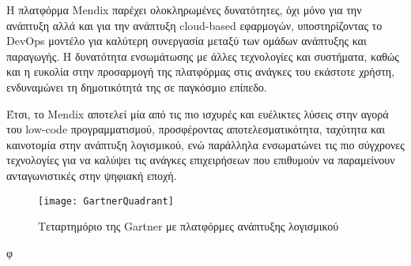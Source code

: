         Η πλατφόρμα Mendix παρέχει ολοκληρωμένες δυνατότητες, όχι μόνο για την ανάπτυξη αλλά και για την ανάπτυξη cloud-based εφαρμογών, υποστηρίζοντας το DevOps μοντέλο για καλύτερη συνεργασία μεταξύ των ομάδων ανάπτυξης και παραγωγής. Η δυνατότητα ενσωμάτωσης με άλλες τεχνολογίες και συστήματα, καθώς και η ευκολία στην προσαρμογή της πλατφόρμας στις ανάγκες του εκάστοτε χρήστη, ενδυναμώνει τη δημοτικότητά της σε παγκόσμιο επίπεδο.

        Έτσι, το Mendix αποτελεί μία από τις πιο ισχυρές και ευέλικτες λύσεις στην αγορά του low-code προγραμματισμού, προσφέροντας αποτελεσματικότητα, ταχύτητα και καινοτομία στην ανάπτυξη λογισμικού, ενώ παράλληλα ενσωματώνει τις πιο σύγχρονες τεχνολογίες για να καλύψει τις ανάγκες επιχειρήσεων που επιθυμούν να παραμείνουν ανταγωνιστικές στην ψηφιακή εποχή.

        \cite{LowCodeMendix}


            \begin{figure}[h!] \noindent \centering
                    \texttt{[image: GartnerQuadrant]}
                    \caption{\centering Τεταρτημόριο της Gartner με πλατφόρμες ανάπτυξης λογισμικού \cite{mendixGartnerQuadrant}}
            \end{figure}
φ
